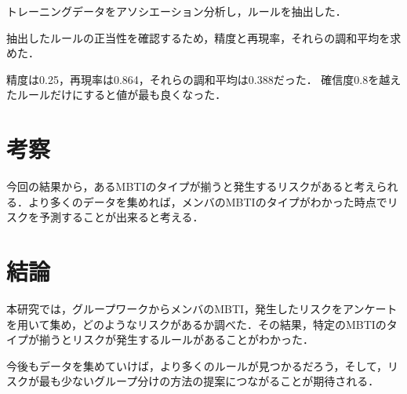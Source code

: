 \documentclass[uplatex,twocolumn,dvipdfmx]{jsarticle}
\begin{document}
トレーニングデータをアソシエーション分析し，ルールを抽出した．

抽出したルールの正当性を確認するため，精度と再現率，それらの調和平均を求めた．

精度は0.25，再現率は0.864，それらの調和平均は0.388だった．
確信度0.8を越えたルールだけにすると値が最も良くなった．



\section{考察}
今回の結果から，あるMBTIのタイプが揃うと発生するリスクがあると考えられる．より多くのデータを集めれば，メンバのMBTIのタイプがわかった時点でリスクを予測することが出来ると考える．

\section{結論}
本研究では，グループワークからメンバのMBTI，発生したリスクをアンケートを用いて集め，どのようなリスクがあるか調べた．その結果，特定のMBTIのタイプが揃うとリスクが発生するルールがあることがわかった．

今後もデータを集めていけば，より多くのルールが見つかるだろう，そして，リスクが最も少ないグループ分けの方法の提案につながることが期待される．
\nocite{MBTI}
\nocite{110009915588}

\end{document}
